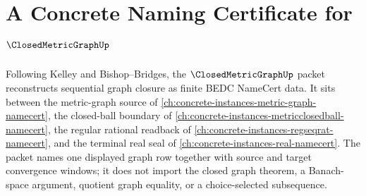 \chapter{A Concrete Naming Certificate for $\ClosedMetricGraphUp$}
\label{ch:concrete-instances-closed-metric-graph-namecert}

Following Kelley and Bishop--Bridges, the $\ClosedMetricGraphUp$ packet reconstructs sequential graph closure as finite BEDC NameCert data. It sits between the metric-graph source of \autoref{ch:concrete-instances-metric-graph-namecert}, the closed-ball boundary of \autoref{ch:concrete-instances-metricclosedball-namecert}, the regular rational readback of \autoref{ch:concrete-instances-regseqrat-namecert}, and the terminal real seal of \autoref{ch:concrete-instances-real-namecert}. The packet names one displayed graph row together with source and target convergence windows; it does not import the closed graph theorem, a Banach-space argument, quotient graph equality, or a choice-selected subsequence.

